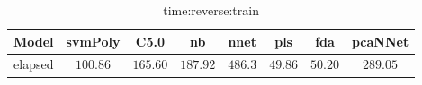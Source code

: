 \begin{table}[!ht]
	\centering
	\begin{tabular}{|c|c|c|c|c|c|c|c|}
		\hline
		Model & svmPoly & C5.0 & nb & nnet & pls & fda & pcaNNet \\ \hline
		elapsed & $100.86$ & $165.60$ & $187.92$ & $486.3$ & $49.86$ & $50.20$ & $289.05$ \\ \hline
	\end{tabular}
	\caption{time:reverse:train}
	\label{tab:time:reverse:train}
\end{table}
